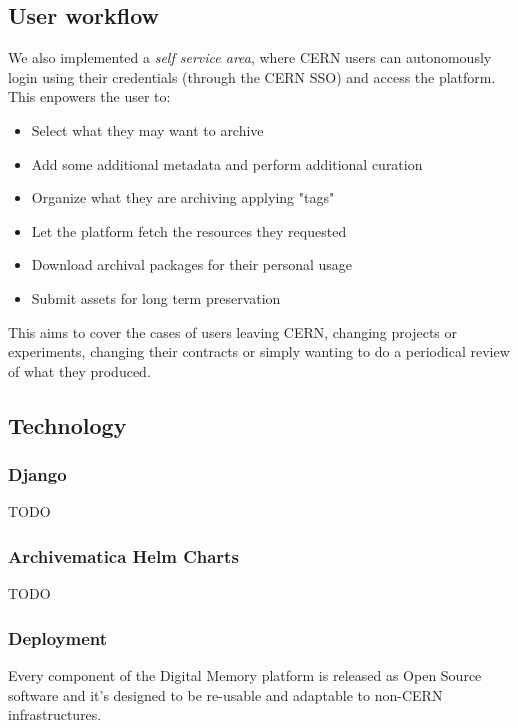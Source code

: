 \documentclass[11pt]{IEEEtran}
\begin{document}
\subsection{User workflow}

We also implemented a \textit{self service area}, where CERN users can autonomously login using their credentials (through the CERN SSO) and access the platform. This enpowers the user to:

\begin{itemize}
    \item Select what they may want to archive 
    \item Add some additional metadata and perform additional curation
    \item Organize what they are archiving applying "tags"
    \item Let the platform fetch the resources they requested 
    \item Download archival packages for their personal usage
    \item Submit assets for long term preservation
\end{itemize}

This aims to cover the cases of users leaving CERN, changing projects or experiments, changing their contracts or simply wanting to do a periodical review of what they produced.

\subsection{Technology}

\subsubsection{Django}

TODO

\subsubsection{Archivematica Helm Charts}

TODO

\subsubsection{Deployment}

Every component of the Digital Memory platform is released as Open Source software and it's designed to be re-usable and adaptable to non-CERN infrastructures.
\end{document}
